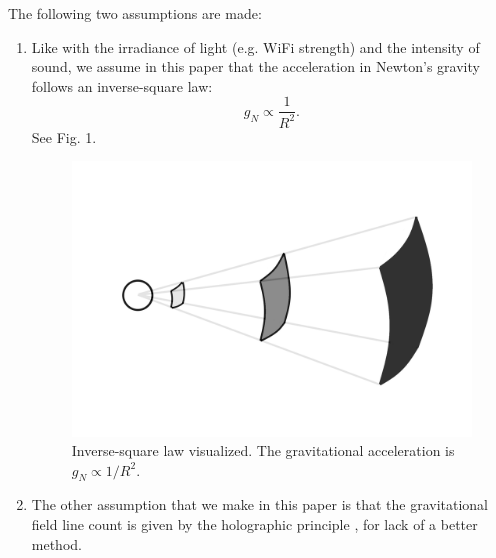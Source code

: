 \documentclass[12pt]{article}
\begin{document}
The following two assumptions are made:
\begin{enumerate}
\item Like with the irradiance of light (e.g. WiFi strength) and the intensity of sound, we assume in this paper that the acceleration in Newton's gravity follows an inverse-square law:
\begin{equation}
g_N \propto \frac{1}{R^2}.
\end{equation}
See Fig. 1.
\begin{figure} 
\centering
  \includegraphics[width = 5 in]{inverse_square_law.png}
  \caption{
Inverse-square law visualized.
The gravitational acceleration is $g_N \propto 1/R^2$.
}
\end{figure}

\item The other assumption that we make in this paper is that the gravitational field line count is given by the holographic principle \cite{hooft, susskind}, for lack of a better method.
\end{enumerate}
\end{document}
